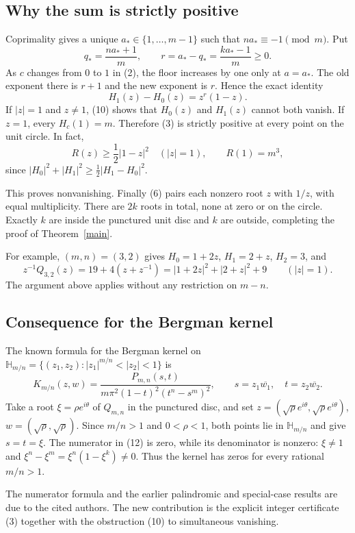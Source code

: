 \documentclass[11pt]{article}
\begin{document}
\subsection*{Why the sum is strictly positive}
Coprimality gives a unique $a_*\in\{1,\ldots,m-1\}$ such that
$na_*\equiv-1\pmod m$. Put
\[
 q_* =\frac{na_*+1}{m},\qquad
 r=a_*-q_* =\frac{ka_*-1}{m}\ge0.
\]
As $c$ changes from $0$ to $1$ in (2), the floor increases by one
only at $a=a_*$. The old exponent there is $r+1$ and the new
exponent is $r$. Hence the exact identity
\[
 \boxed{\ H_1(z)-H_0(z)=z^r(1-z).\ }                            \tag{10}
\]
If $|z|=1$ and $z\ne1$, (10) shows that $H_0(z)$ and $H_1(z)$
cannot both vanish. If $z=1$, every $H_c(1)=m$. Therefore (3)
is strictly positive at every point on the unit circle. In fact,
\[
 R(z)\ge\frac12|1-z|^2\quad(|z|=1),\qquad R(1)=m^3,             \tag{11}
\]
since $|H_0|^2+|H_1|^2\ge\tfrac12|H_1-H_0|^2$.

This proves nonvanishing. Finally (6) pairs each nonzero root $z$
with $1/z$, with equal multiplicity. There are $2k$ roots in total,
none at zero or on the circle. Exactly $k$ are inside the punctured
unit disc and $k$ are outside, completing the proof of
Theorem~\ref{main}.

For example, $(m,n)=(3,2)$ gives
$H_0=1+2z$, $H_1=2+z$, $H_2=3$, and
\[
 z^{-1}Q_{3,2}(z)=19+4(z+z^{-1})
                =|1+2z|^2+|2+z|^2+9\qquad(|z|=1).
\]
The argument above applies without any restriction on $m-n$.

\subsection*{Consequence for the Bergman kernel}
The known formula for the Bergman kernel on
$\mathbb H_{m/n}=\{(z_1,z_2):|z_1|^{m/n}<|z_2|<1\}$ is
\[
 K_{m/n}(z,w)=\frac{P_{m,n}(s,t)}
 {m\pi^2(1-t)^2(t^n-s^m)^2},\qquad
 s=z_1\overline{w_1},\quad t=z_2\overline{w_2}.                   \tag{12}
\]
Take a root $\xi=\rho e^{i\theta}$ of $Q_{m,n}$ in the punctured
disc, and set $z=(\sqrt\rho e^{i\theta},\sqrt\rho e^{i\theta})$,
$w=(\sqrt\rho,\sqrt\rho)$. Since $m/n>1$ and $0<\rho<1$,
both points lie in $\mathbb H_{m/n}$ and give $s=t=\xi$.
The numerator in (12) is zero, while its denominator is nonzero:
$\xi\ne1$ and $\xi^n-\xi^m=\xi^n(1-\xi^k)\ne0$.
Thus the kernel has zeros for every rational $m/n>1$.

The numerator formula and the earlier palindromic and special-case
results are due to the cited authors. The new contribution is the
explicit integer certificate (3) together with the obstruction (10)
to simultaneous vanishing.
\end{document}
